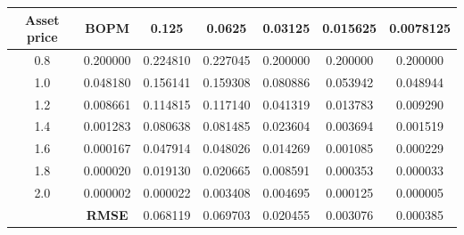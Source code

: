 \begin{table}[H]
    \begin{tabular}{@{}ccccccc@{}}
        \toprule
        \textbf{Asset price} & \textbf{BOPM} & 0.125    & 0.0625   & 0.03125  & 0.015625 & 0.0078125 \\ \midrule
        0.8                  & 0.200000      & 0.224810 & 0.227045 & 0.200000 & 0.200000 & 0.200000  \\
        1.0                  & 0.048180      & 0.156141 & 0.159308 & 0.080886 & 0.053942 & 0.048944  \\
        1.2                  & 0.008661      & 0.114815 & 0.117140 & 0.041319 & 0.013783 & 0.009290  \\
        1.4                  & 0.001283      & 0.080638 & 0.081485 & 0.023604 & 0.003694 & 0.001519  \\
        1.6                  & 0.000167      & 0.047914 & 0.048026 & 0.014269 & 0.001085 & 0.000229  \\
        1.8                  & 0.000020      & 0.019130 & 0.020665 & 0.008591 & 0.000353 & 0.000033  \\
        2.0                  & 0.000002      & 0.000022 & 0.003408 & 0.004695 & 0.000125 & 0.000005  \\
                             & \textbf{RMSE} & 0.068119 & 0.069703 & 0.020455 & 0.003076 & 0.000385  \\ \bottomrule
    \end{tabular}
\end{table}

